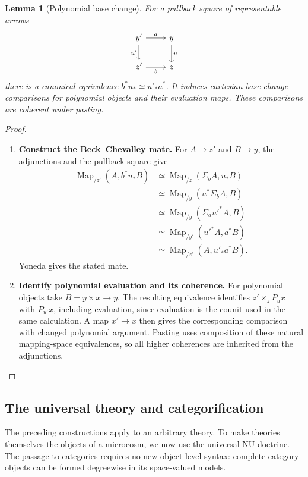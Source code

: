 \documentclass[oneside]{article}
\theoremstyle{plain}
\newtheorem{lemma}[theorem]{Lemma}
\theoremstyle{definition}
\theoremstyle{remark}
\newcommand{\Map}{\operatorname{Map}}
\begin{document}
\begin{lemma}[Polynomial base change]
\label{lem:polynomial-bc}
    For a pullback square of representable arrows
    \[
        \begin{tikzcd}
            y'\ar[r,"a"]\ar[d,"u'"']&y\ar[d,"u"]\\
            z'\ar[r,"b"']&z
        \end{tikzcd}
    \]
    there is a canonical equivalence $b^*u_*\simeq u'_*a^*$. It induces cartesian base-change comparisons for polynomial objects and their evaluation maps. These comparisons are coherent under pasting.
\end{lemma}
\begin{proof}
    \leavevmode
    \begin{enumerate}
        \item \textbf{Construct the Beck--Chevalley mate.} For $A\to z'$ and $B\to y$, the adjunctions and the pullback square give
        \begin{align*}
            \Map_{/z'}(A,b^*u_*B)
            &\simeq\Map_{/z}(\Sigma_bA,u_*B)\\
            &\simeq\Map_{/y}(u^*\Sigma_bA,B)\\
            &\simeq\Map_{/y}(\Sigma_a u'^*A,B)\\
            &\simeq\Map_{/y'}(u'^*A,a^*B)\\
            &\simeq\Map_{/z'}(A,u'_*a^*B).
        \end{align*}
        Yoneda gives the stated mate.

        \item \textbf{Identify polynomial evaluation and its coherence.} For polynomial objects take $B=y\times x\to y$. The resulting equivalence identifies $z'\times_zP_ux$ with $P_{u'}x$, including evaluation, since evaluation is the counit used in the same calculation. A map $x'\to x$ then gives the corresponding comparison with changed polynomial argument. Pasting uses composition of these natural mapping-space equivalences, so all higher coherences are inherited from the adjunctions.\qedhere
    \end{enumerate}
\end{proof}

\subsection{The universal theory and categorification}
\label{subsec:universal-theory}

The preceding constructions apply to an arbitrary theory. To make theories
themselves the objects of a microcosm, we now use the universal NU
doctrine. The passage to categories requires no new object-level syntax:
complete category objects can be formed degreewise in its space-valued
models.
\end{document}
